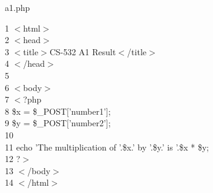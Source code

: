 \begin{center}
	\vspace*{5mm}
	a1.php\\
	\hdashrule{15cm}{1pt}{1pt}
\end{center}
1	 \hspace*{5mm}$<$html$>$\\
2	 \hspace*{5mm}$<$head$>$\\
3	 \hspace*{5mm}$<$title$>$CS-532 A1 Result$<$/title$>$\\
4	 \hspace*{5mm}$<$/head$>$\\
5	 \hspace*{5mm}\\
6	 \hspace*{5mm}$<$body$>$\\
7	 \hspace*{5mm}$<$?php\\
8	 \hspace*{5mm}	\hspace*{5mm}\$x = \$\_POST['number1'];\\
9	 \hspace*{5mm}	\hspace*{5mm}\$y = \$\_POST['number2'];\\
10	 \hspace*{5mm}    \hspace*{5mm}\\
11	 \hspace*{5mm}	\hspace*{5mm}echo 'The multiplication of '.\$x.' by '.\$y.' is '.\$x * \$y;\\
12	 \hspace*{5mm}?$>$\\
13	 \hspace*{5mm}$<$/body$>$\\
14	 \hspace*{5mm}$<$/html$>$\\